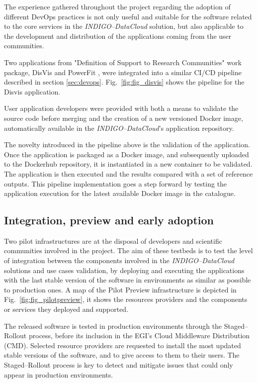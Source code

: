 \documentclass[journal]{IEEEtran}
\begin{document}
The experience gathered throughout the project regarding the adoption of
different DevOps practices is not only useful and suitable for the software related
to the core services in the {\sl INDIGO--DataCloud} solution, but also applicable to the
development and distribution of the applications coming from the user communities.

Two applications from "Definition of Support to Research Communities" work package,
DisVis \cite{disvis} and PowerFit \cite{powerfit}, were
integrated into a similar CI/CD pipeline described in section \ref{sec:devops}.
Fig.~\ref{fig:fig_disvis} shows the pipeline for the Disvis application.

User application developers were provided with both a means to validate the
source code before merging and the creation of a new versioned Docker image,
automatically available in the {\sl INDIGO--DataCloud}'s application repository.

The novelty introduced in the pipeline above is the validation of the application.
Once the application is packaged as a Docker image, and subsequently uploaded
to the Dockerhub repository, it is instantiated in a new container to be validated.
The application is then executed and the results compared with a set of reference outputs.
This pipeline implementation goes a step forward by testing the application
execution for the latest available Docker image in the catalogue.


\subsection{Integration, preview and early adoption}

Two pilot infrastructures are at the disposal of developers and scientific
communities involved in the project. The aim of these testbeds is to test the
level of integration between the components involved in the {\sl INDIGO--DataCloud}
solutions and use cases validation, by deploying and executing the applications
with the last stable version of the software in environments as similar as
possible to production ones. A map of the Pilot Preview
infrastructure is depicted in Fig.~\ref{fig:fig_pilotpreview}, it shows the
resources providers and the components or services they deployed and supported.

The released software is tested in production environments through the
Staged--Rollout process, before its inclusion in the EGI's Cloud Middleware Distribution (CMD).
Selected resource providers are requested to install
the most updated stable versions of the software, and to give access to them to their users. The
Staged--Rollout process is key to detect and mitigate issues that could only
appear in production environments.
\end{document}
